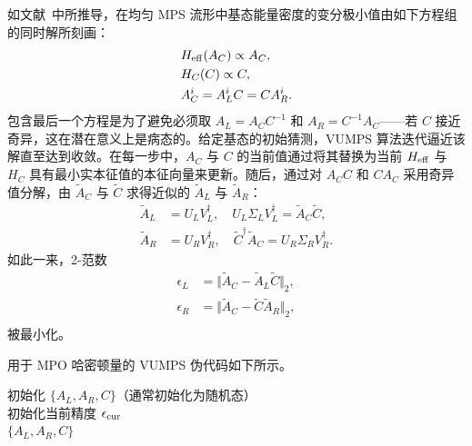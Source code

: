 如文献~\cite{Zauner-Stauber2018a}中所推导，在均匀 MPS 流形中基态能量密度的变分极小值由如下方程组的同时解所刻画：
\begin{equation}
\begin{split}
    &H_{\rm eff}(A_C) \propto A_C ,\\
    &H_C(C) \propto C, \\
    &A^i_C = A_L^iC = CA_R^i.
\end{split}
\end{equation}
包含最后一个方程是为了避免必须取 $A_L=A_CC^{-1}$ 和 $A_R=C^{-1}A_C$——若 $C$ 接近奇异，这在潜在意义上是病态的。给定基态的初始猜测，VUMPS 算法迭代逼近该解直至达到收敛。在每一步中，$A_C$ 与 $C$ 的当前值通过将其替换为当前 $H_{\rm eff}$ 与 $H_C$ 具有最小实本征值的本征向量来更新。随后，通过对 $A_CC$ 和 $CA_C$ 采用奇异值分解，由 $\tilde A_C$ 与 $\tilde C$ 求得近似的 $\tilde A_L$ 与 $\tilde A_R$：
\begin{equation}\label{eq:approxALAR}
\begin{split}
    \tilde A_L &= U_LV_L^\dagger, \quad U_L\Sigma_LV_L^\dagger =\tilde A_C\tilde C,\\
    \tilde A_R &= U_RV_R^\dagger,  \quad \tilde C^\dagger \tilde A_C = U_R\Sigma_R V_R^\dagger.
\end{split}
\end{equation}
如此一来，2-范数
\begin{equation}
\begin{split}
    \epsilon_L &= \Vert\tilde A_C - \tilde A_L\tilde C\Vert_2, \\
    \epsilon_R &= \Vert\tilde A_C - \tilde C\tilde A_R\Vert_2, \\
\end{split}
\end{equation}
被最小化。

用于 MPO 哈密顿量的 VUMPS 伪代码如下所示。

\begin{algorithm}[H]
\caption{VUMPS}
    初始化 $\{A_L,A_R,C\}$（通常初始化为随机态）\\
    初始化当前精度 $\epsilon_{\rm cur}$\\
    \Return $\{A_L,A_R,C\}$
\end{algorithm}
